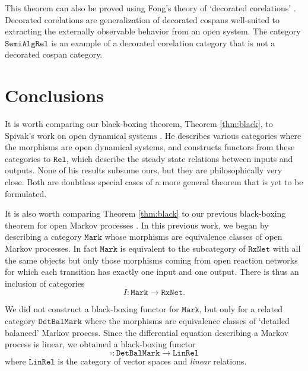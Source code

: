 \documentclass{compositionalityarticle}
\newcommand{\RxNet}{\mathtt{RxNet}}
\newcommand{\Mark}{\mathtt{Mark}}
\newcommand{\DetBalMark}{\mathtt{DetBalMark}}
\newcommand{\Rel}{\mathtt{Rel}}
\newcommand{\LinRel}{\mathtt{LinRel}}
\newcommand{\SemiAlgRel}{\mathtt{SemiAlgRel}}
\newcommand{\maps}{\colon}
\theoremstyle{plain}
\theoremstyle{remark}
\begin{document}
This theorem can also be proved using Fong's theory of `decorated corelations' \cite{FongThesis,Fong2017}.  Decorated corelations are generalization of decorated cospans well-suited to extracting the externally observable behavior from an open system.    The category 
$\SemiAlgRel$ is an example of a decorated corelation category that is not a decorated cospan category.

\section{Conclusions}
\label{sec:conclusions}

It is worth comparing our black-boxing theorem, Theorem \ref{thm:black}, to Spivak's work on open dynamical systems \cite{Spivak}.  He describes various  categories where the morphisms are open dynamical systems, and constructs functors from these categories to $\Rel$, which describe the steady state relations between inputs and outputs.  None of his results subsume ours, but they are philosophically very close.  Both are doubtless special cases of a more general theorem that is yet to be formulated.

It is also worth comparing Theorem \ref{thm:black} to our previous black-boxing theorem for open Markov processes \cite{BaezFongPollard}.  In this previous work, we began by describing a category $\Mark$ whose morphisms are equivalence classes of open Markov processes.  In fact $\Mark$ is equivalent to the subcategory of $\RxNet$ with all the same objects but only those morphisms coming from open reaction networks for which each transition has exactly one input and one output.  There is
thus an inclusion of categories
\[        I \maps \Mark \to \RxNet .\]

We did not construct a black-boxing functor for $\Mark$, but only for a related category $\DetBalMark$ where the morphisms are equivalence classes of `detailed balanced' Markov process.  Since the differential equation describing a Markov process is linear, we obtained a black-boxing functor
\[  \square \maps \DetBalMark \to \LinRel  \]
where $\LinRel$ is the category of vector spaces and \emph{linear} relations.    
\end{document}
